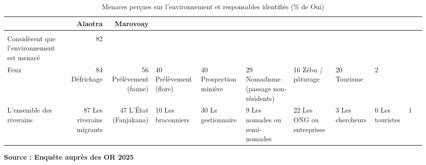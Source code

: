 \documentclass[letterpaper]{report}
\begin{document}
\begin{table}

\caption{\label{tbl-menaces}Menaces perçues sur l'environnement et
responsables identifiés (\% de Oui)}

\centering

\fontsize{12.0pt}{14.0pt}\selectfont
\begin{tabular*}{\linewidth}{@{\extracolsep{\fill}}lrr}
\toprule
 & {\bfseries {Alaotra}} & {\bfseries {Marovoay}} \\ 
\midrule\addlinespace[2.5pt]
 \\[2.5pt] 
\midrule\addlinespace[2.5pt]
Considèrent que l'environnement est menacé & 82 %
\midrule\addlinespace[2.5pt]
 \\[2.5pt] 
\midrule\addlinespace[2.5pt]
Feux & 84 %
Défrichage & 56 %
Prélèvement (faune) & 40 %
Prélèvement (flore) & 40 %
Prospection minière & 29 %
Nomadisme (passage non-résidents) & 16 %
Zébu / pâturage & 20 %
Tourisme & 2 %
\midrule\addlinespace[2.5pt]
 \\[2.5pt] 
\midrule\addlinespace[2.5pt]
L'ensemble des riverains & 87 %
Les riverains migrants & 47 %
L'État (Fanjakana) & 10 %
Les braconniers & 30 %
Le gestionnaire & 9 %
Les nomades ou semi-nomades & 22 %
Les ONG ou entreprises & 3 %
Les chercheurs & 0 %
Les touristes & 1 %
\bottomrule
\end{tabular*}
\begin{minipage}{\linewidth}
\textbf{Source : Enquête auprès des OR 2025}\\
\end{minipage}


\end{table}%
\end{document}

